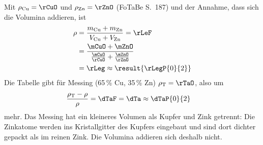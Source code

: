 Mit $\rho_\text{Cu} = \rCuO$ und $\rho_\text{Zn} = \rZnO$ (FoTaBe S.~187) und der Annahme, dass sich die Volumina addieren, ist
\begin{align}
 \rho &= \frac{m_\text{Cu}+m_\text{Zn}}{V_\text{Cu}+V_\text{Zn}} = \rLeF \\
   &= \frac{\mCuO+\mZnO}{\frac{\mCuO}{\rCuO}+\frac{\mZnO}{\rZnO}} \\
   &= \rLeg \approx \result{\rLegP{0}{2}}
\end{align}
Die Tabelle gibt für Messing (65\,\% Cu, 35\,\% Zn) $\rho_\text{T} = \rTaO$, also um
\begin{align}
 \frac{\rho_\text{T}-\rho}{\rho} &= \dTaF = \dTa \approx \dTaP{0}{2}
\end{align}
mehr. Das Messing hat ein kleineres Volumen als Kupfer und Zink getrennt: Die Zinkatome werden ins Kristallgitter des Kupfers eingebaut und sind dort dichter gepackt als im reinen Zink. Die Volumina addieren sich deshalb nicht.
